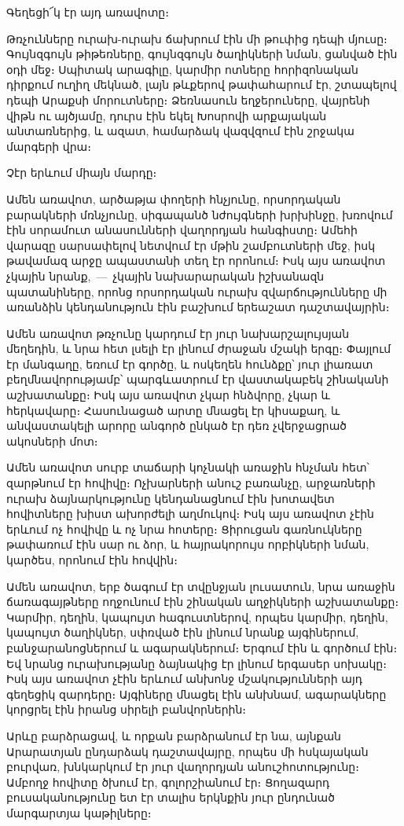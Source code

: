 Գեղեցի՜կ էր այդ առավոտը։

Թռչունները ուրախ-ուրախ ճախրում էին մի թուփից դեպի մյուսը։ Գույնզգույն
թի\-թեռ\-ները, գույնզգույն ծաղիկների նման, ցանված էին օդի մեջ։ Սպիտակ արագիլը,
կարմիր ոտները հորիզոնական դիրքում ուղիղ մեկնած, լայն թևքերով թափահարում էր,
շտապելով դեպի Արաքսի մորուտները։ Ձեռնասուն եղջերուները, վայրենի վիթն ու
այծյամը, դուրս էին եկել Խոսրովի արքայական անտառներից, և ազատ, համարձակ
վազվզում էին շրջակա մարգերի վրա։

Չէր երևում միայն մարդը։

Ամեն առավոտ, արծաթյա փողերի հնչյունը, որսորդական բարակների մռնչյունը,
սի\-գա\-պանծ նժույգների խրխինջը, խռովում էին սորամուտ անասունների վաղորդյան
հանգիստը։ Ամեհի վարազը սարսափելով նետվում էր մթին շամբուտների մեջ, իսկ թավամազ
արջը ապաստանի տեղ էր որոնում։ Իսկ այս առավոտ չկային նրանք,~—~չկային
նախարարական իշխանազն պատանիները, որոնց որսորդական ուրախ զվարճությունները մի
առանձին կեն\-դա\-նու\-թյուն էին բաշխում երեաշատ դաշտավայրին։

Ամեն առավոտ թռչունը կարդում էր յուր նախարշալույսյան մեղեդին, և նրա հետ լսելի
էր լինում ժրաջան մշակի երգը։ Փայլում էր մանգաղը, եռում էր գործը, և ոսկեղեն
հունձքը՝ յուր լիառատ բեղմնավորությամբ՝ պարգևատրում էր վաստակաբեկ շինականի
աշխատանքը։ Իսկ այս առավոտ չկար հնձվորը, չկար և հերկավարը։ Հասունացած արտը
մնացել էր կիսաքաղ, և անվաստակելի արորը անգործ ընկած էր դեռ չվերջացրած ակոսների
մոտ։

Ամեն առավոտ սուրբ տաճարի կոչնակի առաջին հնչման հետ՝ զարթնում էր հովիվը։
Ոչխարների անուշ բառանչը, արջառների ուրախ ձայնարկությունը կենդանացնում էին
խո\-տա\-վետ հովիտները խիստ ախորժելի աղմուկով։ Իսկ այս առավոտ չէին երևում ոչ
հովիվը և ոչ նրա հոտերը։ Ցիրուցան գառնուկները թափառում էին սար ու ձոր, և
հայրակորույս որբիկների նման, կարծես, որոնում էին հովվին։

Ամեն առավոտ, երբ ծագում էր տվընջյան լուսատուն, նրա առաջին ճառագայթները
ողջունում էին շինական աղջիկների աշխատանքը։ Կարմիր, դեղին, կապույտ
հագուստներով, որպես կարմիր, դեղին, կապույտ ծաղիկներ, սփռված էին լինում նրանք
այգիներում, բան\-ջա\-րա\-նոց\-նե\-րում և ագարակներում։ Երգում էին և գործում
էին։ Եվ նրանց ուրախությանը ձայնակից էր լինում երգասեր սոխակը։ Իսկ այս առավոտ
չէին երևում անխոնջ մշա\-կու\-թյուն\-նե\-րի այդ գեղեցիկ զարդերը։ Այգիները
մնացել էին անխնամ, ագարակները կորցրել էին իրանց սիրելի բանվորներին։

Արևը բարձրացավ, և որքան բարձրանում էր նա, այնքան Արարատյան ընդարձակ
դաշ\-տա\-վայրը, որպես մի հսկայական բուրվառ, խնկարկում էր յուր վաղորդյան
անուշհոտությունը։ Ամբողջ հովիտը ծխում էր, գոլորշիանում էր։ Ցողազարդ
բուսականությունը ետ էր տալիս երկնքին յուր ընդունած մարգարտյա կաթիլները։

\bye
